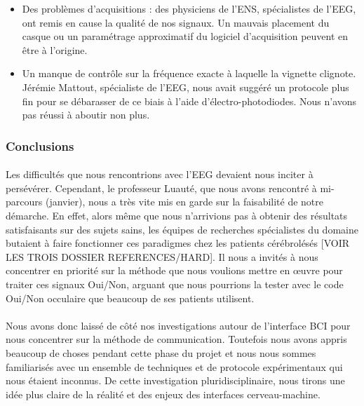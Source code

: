 \documentclass[11pt,a4paper]{article}
\theoremstyle{plain}
\theoremstyle{definition}
\begin{document}
\begin{itemize}
\item Des problèmes d'acquisitions : des physiciens de l'ENS, spécialistes de l'EEG, ont remis en cause la qualité de nos signaux. Un mauvais placement du casque ou un paramétrage approximatif du logiciel d'acquisition peuvent en être à l'origine.
\item Un manque de contrôle sur la fréquence exacte à laquelle la vignette clignote. Jérémie Mattout, spécialiste de l'EEG, nous avait suggéré un protocole
plus fin pour se débarasser de ce biais à l'aide d'électro-photodiodes. Nous n'avons pas réussi à aboutir non plus.
\end{itemize}

\subsubsection{Conclusions}

\paragraph{} Les difficultés que nous rencontrions avec l'EEG devaient nous inciter à persévérer. Cependant, le professeur Luauté, que nous avons rencontré à mi-parcours (janvier), nous a très vite mis en garde sur la faisabilité de notre démarche. En effet, alors même que nous n'arrivions pas à obtenir des résultats satisfaisants sur des sujets sains, les équipes de recherches spécialistes du domaine butaient à faire fonctionner ces paradigmes chez les patients cérébrolésés [VOIR LES TROIS DOSSIER REFERENCES/HARD]. Il nous a invités à nous concentrer en priorité sur la méthode que nous voulions mettre en \oe uvre pour traiter ces signaux Oui/Non, arguant que nous pourrions la tester avec le code Oui/Non occulaire que beaucoup de ses patients utilisent. 

\paragraph{} Nous avons donc laissé de côté nos investigations autour de l'interface BCI pour nous concentrer sur la méthode de communication. Toutefois nous avons appris beaucoup de choses pendant cette phase du projet et nous nous sommes familiarisés avec un ensemble de techniques et de protocole expérimentaux qui nous étaient inconnus. De cette investigation pluridisciplinaire, nous tirons une idée plus claire de la réalité et des enjeux des interfaces cerveau-machine.
\end{document}
